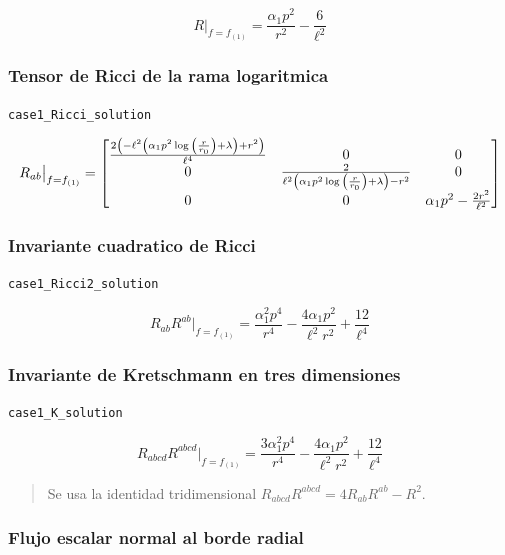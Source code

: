\documentclass[11pt,a4paper]{article}
\begin{document}
\[
R\big|_{f=f_{(1)}} = \frac{\alpha_{1} p^{2}}{r^{2}} - \frac{6}{\ell^{2}}
\]

\subsubsection{Tensor de Ricci de la rama logaritmica}

\noindent\texttt{case1\_Ricci\_solution}\par\nopagebreak[4]

\[
\resizebox{\textwidth}{!}{$\displaystyle R_{ab}\big|_{f=f_{(1)}} = \left[\begin{matrix}\frac{2 \left(- \ell^{2} \left(\alpha_{1} p^{2} \log{\left(\frac{r}{r_{0}} \right)} + \lambda\right) + r^{2}\right)}{\ell^{4}} & 0 & 0\\0 & \frac{2}{\ell^{2} \left(\alpha_{1} p^{2} \log{\left(\frac{r}{r_{0}} \right)} + \lambda\right) - r^{2}} & 0\\0 & 0 & \alpha_{1} p^{2} - \frac{2 r^{2}}{\ell^{2}}\end{matrix}\right]$}
\]

\subsubsection{Invariante cuadratico de Ricci}

\noindent\texttt{case1\_Ricci2\_solution}\par\nopagebreak[4]

\[
R_{ab}R^{ab}\big|_{f=f_{(1)}} = \frac{\alpha_{1}^{2} p^{4}}{r^{4}} - \frac{4 \alpha_{1} p^{2}}{\ell^{2} r^{2}} + \frac{12}{\ell^{4}}
\]

\subsubsection{Invariante de Kretschmann en tres dimensiones}

\noindent\texttt{case1\_K\_solution}\par\nopagebreak[4]

\[
R_{abcd}R^{abcd}\big|_{f=f_{(1)}} = \frac{3 \alpha_{1}^{2} p^{4}}{r^{4}} - \frac{4 \alpha_{1} p^{2}}{\ell^{2} r^{2}} + \frac{12}{\ell^{4}}
\]

\begin{quote}\small Se usa la identidad tridimensional \(R_{abcd}R^{abcd}=4R_{ab}R^{ab}-R^2\).\end{quote}

\subsubsection{Flujo escalar normal al borde radial}
\end{document}

